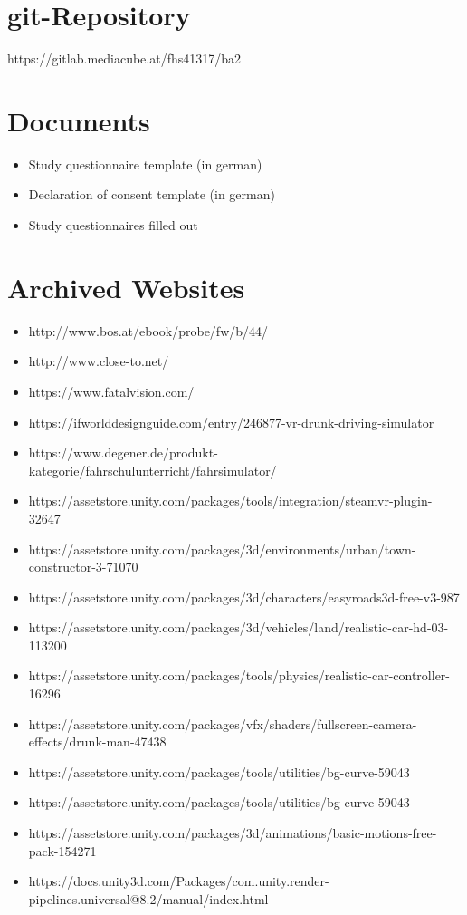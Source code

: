 \begin{appendices}



\section{git-Repository}

https://gitlab.mediacube.at/fhs41317/ba2

\section{Documents}
\label{appendix:documents}

\begin{itemize}
	\item Study questionnaire template (in german)
	\item Declaration of consent template (in german)
	\item Study questionnaires filled out
\end{itemize}

\section{Archived Websites}

\begin{itemize}
	\item http://www.bos.at/ebook/probe/fw/b/44/
	\item http://www.close-to.net/
	\item https://www.fatalvision.com/
	\item https://ifworlddesignguide.com/entry/246877-vr-drunk-driving-simulator
	\item https://www.degener.de/produkt-kategorie/fahrschulunterricht/fahrsimulator/
	\item https://assetstore.unity.com/packages/tools/integration/steamvr-plugin-32647
	\item https://assetstore.unity.com/packages/3d/environments/urban/town-constructor-3-71070
	\item https://assetstore.unity.com/packages/3d/characters/easyroads3d-free-v3-987
	\item https://assetstore.unity.com/packages/3d/vehicles/land/realistic-car-hd-03-113200
	\item https://assetstore.unity.com/packages/tools/physics/realistic-car-controller-16296
	\item https://assetstore.unity.com/packages/vfx/shaders/fullscreen-camera-effects/drunk-man-47438
	\item https://assetstore.unity.com/packages/tools/utilities/bg-curve-59043
	\item https://assetstore.unity.com/packages/tools/utilities/bg-curve-59043
	\item https://assetstore.unity.com/packages/3d/animations/basic-motions-free-pack-154271
	\item https://docs.unity3d.com/Packages/com.unity.render-pipelines.universal@8.2/manual/index.html
\end{itemize}

\end{appendices}

